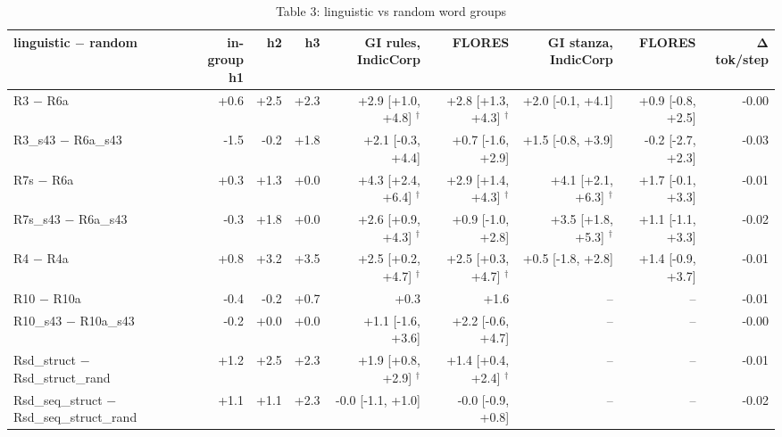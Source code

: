 \begin{table}[t]
\centering
\small
\caption{Table 3: linguistic vs random word groups}
\label{tab:table3_controls}
\begin{tabular}{lrrrrrrrr}
\toprule
linguistic $-$ random & in-group h1 & h2 & h3 & GI rules, IndicCorp & FLORES & GI stanza, IndicCorp & FLORES & Δ tok/step \\
\midrule
R3 $-$ R6a & +0.6 & +2.5 & +2.3 & +2.9 [+1.0, +4.8] $^\dagger$ & +2.8 [+1.3, +4.3] $^\dagger$ & +2.0 [-0.1, +4.1] & +0.9 [-0.8, +2.5] & -0.00 \\
R3\_s43 $-$ R6a\_s43 & -1.5 & -0.2 & +1.8 & +2.1 [-0.3, +4.4] & +0.7 [-1.6, +2.9] & +1.5 [-0.8, +3.9] & -0.2 [-2.7, +2.3] & -0.03 \\
R7s $-$ R6a & +0.3 & +1.3 & +0.0 & +4.3 [+2.4, +6.4] $^\dagger$ & +2.9 [+1.4, +4.3] $^\dagger$ & +4.1 [+2.1, +6.3] $^\dagger$ & +1.7 [-0.1, +3.3] & -0.01 \\
R7s\_s43 $-$ R6a\_s43 & -0.3 & +1.8 & +0.0 & +2.6 [+0.9, +4.3] $^\dagger$ & +0.9 [-1.0, +2.8] & +3.5 [+1.8, +5.3] $^\dagger$ & +1.1 [-1.1, +3.3] & -0.02 \\
R4 $-$ R4a & +0.8 & +3.2 & +3.5 & +2.5 [+0.2, +4.7] $^\dagger$ & +2.5 [+0.3, +4.7] $^\dagger$ & +0.5 [-1.8, +2.8] & +1.4 [-0.9, +3.7] & -0.01 \\
R10 $-$ R10a & -0.4 & -0.2 & +0.7 & +0.3 & +1.6 & -- & -- & -0.01 \\
R10\_s43 $-$ R10a\_s43 & -0.2 & +0.0 & +0.0 & +1.1 [-1.6, +3.6] & +2.2 [-0.6, +4.7] & -- & -- & -0.00 \\
Rsd\_struct $-$ Rsd\_struct\_rand & +1.2 & +2.5 & +2.3 & +1.9 [+0.8, +2.9] $^\dagger$ & +1.4 [+0.4, +2.4] $^\dagger$ & -- & -- & -0.01 \\
Rsd\_seq\_struct $-$ Rsd\_seq\_struct\_rand & +1.1 & +1.1 & +2.3 & -0.0 [-1.1, +1.0] & -0.0 [-0.9, +0.8] & -- & -- & -0.02 \\
\bottomrule
\end{tabular}
\end{table}
